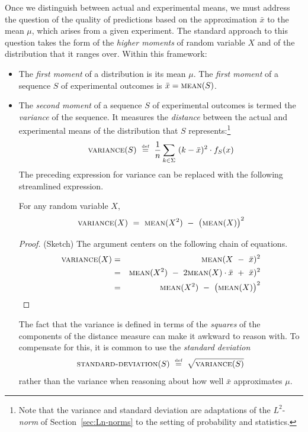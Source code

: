  

Once we distinguish between actual and experimental means, we must address the question of the quality of predictions based on the approximation $\bar{x}$ to the mean $\mu$, which arises from a given experiment.  The standard approach to this question takes the form of the {\em higher moments} of random variable $X$ and of the distribution that it ranges over.  Within this framework:
\begin{itemize}
\item
The {\em first moment} of a distribution is its mean $\mu$.  The  {\em first moment} of a sequence $S$ of experimental outcomes is $\bar{x}  =  \mbox{\sc mean}(S)$.
\item
The {\em second moment} of a sequence $S$ of experimental outcomes is termed the {\it variance} of the sequence.   It measures the {\em distance} between the actual and experimental means of the distribution that $S$ represents:\footnote{Note that the variance and standard deviation are adaptations of the $L^2$-{\it norm} of Section~\ref{sec:Ln-norms} to the setting of probability and statistics.}
\[  \mbox{\sc variance}(S) \ \stackrel{\mbox{{\tiny def}}}{=} \ {1 \over n} \sum_{k \in \Sigma}
\ (k - \bar{x})^2 \cdot f_S(x) 
\]
The preceding expression for variance can be replaced with the
following streamlined expression.

\begin{prop}
\label{thm:variance-formula}
For any random variable $X$,
\[ \mbox{\sc variance}(X) \ = \ \mbox{\sc mean}(X^2) \ - \ \big(\mbox{\sc mean}(X)\big)^2 \]
\end{prop}

\begin{proof}{(Sketch)}
The argument centers on the following chain of equations.
\begin{eqnarray*}
\mbox{\sc variance}(X) & = &
  \mbox{\sc mean}(X \ - \ \bar{x})^2 \\
 & = &
\mbox{\sc mean}(X^2) \ - \ 2 \mbox{\sc mean}(X) \cdot \bar{x} \ + \ \bar{x})^2 \\
 & = &
\mbox{\sc mean}(X^2) \ - \ \big(\mbox{\sc mean}(X)\big)^2
\end{eqnarray*}
\end{proof}


The fact that the variance is defined in terms of the {\em squares} of the components of the distance measure can make it awkward to reason with.  To compensate for this, it is common to use the {\it standard deviation}
\[ \mbox{\sc standard-deviation}(S) \ \eqdef \ \sqrt{\mbox{\sc variance}(S)} \]
rather than the variance when reasoning about how well $\bar{x}$ approximates $\mu$.


\end{itemize}
